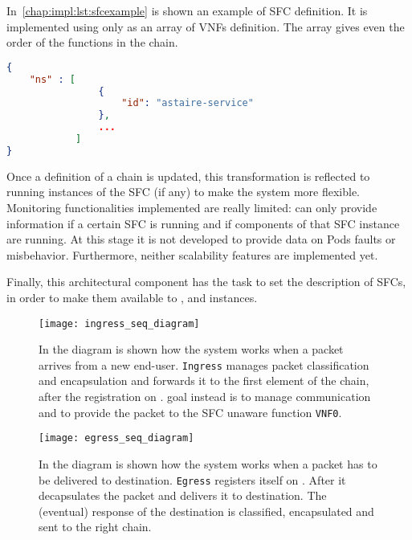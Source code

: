 In~\ref{chap:impl:lst:sfcexample} is shown an example of SFC definition. It is
implemented using only as an array of VNFs definition. The array gives even the
order of the functions in the chain.
\begin{lstlisting}[caption={Example of SFC definition}, captionpos=b,
                   language=json, label=chap:impl:lst:sfcexample]
{
    "ns" : [
                {
                    "id": "astaire-service"
                },
                ...
            ]
}
\end{lstlisting}

Once a definition of a chain is updated, this transformation is reflected to
running instances of the SFC (if any) to make the system more flexible.
Monitoring functionalities implemented are really limited: \harbor{} can only
provide information if a certain SFC is running and if components of that SFC
instance are running. At this stage it is not developed to provide data on Pods
faults or misbehavior. Furthermore, neither scalability features are implemented
yet.

Finally, this architectural component has the task to set the description of
SFCs, in order to make them available to \ingresses{}, \egresses{} and
\astaire{} instances.

\begin{figure}
  \centering \texttt{[image: ingress\_seq\_diagram]}
  \caption[Sequence diagram - Incoming traffic management]{In the diagram is
  shown how the system works when a packet arrives from a new end-user. 
  \texttt{Ingress} manages packet classification and encapsulation and forwards
  it to the first element of the chain, after the registration on \roulette{}. 
  \astaire{} goal instead is to manage communication and to provide the packet
  to the SFC unaware function \texttt{VNF0}.}
  \label{chap:impl:img:ingrdiagram}
\end{figure}

\begin{figure}
  \centering \texttt{[image: egress\_seq\_diagram]}
  \caption[Sequence diagram - Outgoing traffic management]{In the diagram is
  shown how the system works when a packet has to be delivered to destination.
  \texttt{Egress} registers itself on \roulette{}. After it decapsulates the
  packet and delivers it to destination. The (eventual) response of the
  destination is classified, encapsulated and sent to the right chain.}
  \label{chap:impl:img:egrdiagram}
\end{figure}


